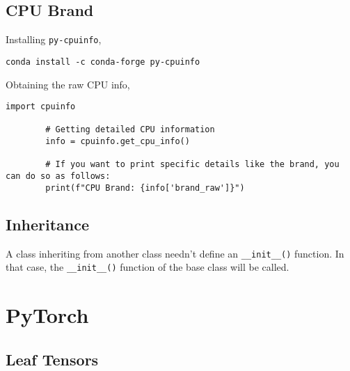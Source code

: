 \documentclass[12pt, a4paper]{scrbook}
\numberwithin{equation}{section}
\theoremstyle{definition}
\theoremstyle{definition}
\begin{document}
	\section{CPU Brand}
	
	Installing \texttt{py-cpuinfo},
	
	\begin{lstlisting}[style=mystylepython, label=alg:cpu_info__install, xleftmargin=\parindent]
		conda install -c conda-forge py-cpuinfo
	\end{lstlisting}

	Obtaining the raw CPU info,
	
	\begin{lstlisting}[style=mystylepython, label=alg:cpu_info__usage, xleftmargin=\parindent]
		import cpuinfo
		
		# Getting detailed CPU information
		info = cpuinfo.get_cpu_info()
		
		# If you want to print specific details like the brand, you can do so as follows:
		print(f"CPU Brand: {info['brand_raw']}")
	\end{lstlisting}

	\section{Inheritance}
		
		A class inheriting from another class needn't define an \texttt{__init__()} function. In that case, the \texttt{__init__()} function of the base class will be called.
		
		
	
	\chapter{PyTorch}
	
	\section{Leaf Tensors}
	
\end{document}
